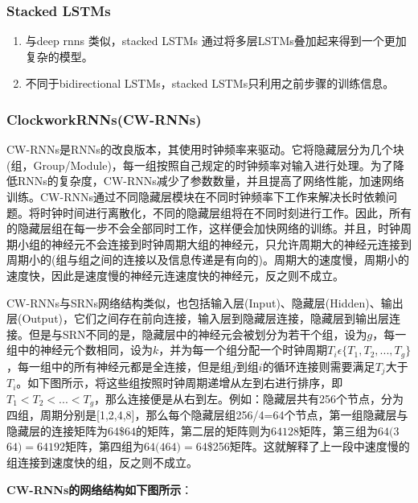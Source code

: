 \subsubsection{ Stacked LSTMs}\label{stacked-lstms}

\begin{enumerate}
\def\labelenumi{\arabic{enumi}.}
\item
  与deep rnns 类似，stacked LSTMs
  通过将多层LSTMs叠加起来得到一个更加复杂的模型。
\item
  不同于bidirectional LSTMs，stacked LSTMs只利用之前步骤的训练信息。
\end{enumerate}

\subsubsection{ ClockworkRNNs(CW-RNNs)}\label{clockwork-rnnscw-rnns}

​
CW-RNNs是RNNs的改良版本，其使用时钟频率来驱动。它将隐藏层分为几个块(组，Group/Module)，每一组按照自己规定的时钟频率对输入进行处理。为了降低RNNs的复杂度，CW-RNNs减少了参数数量，并且提高了网络性能，加速网络训练。CW-RNNs通过不同隐藏层模块在不同时钟频率下工作来解决长时依赖问题。将时钟时间进行离散化，不同的隐藏层组将在不同时刻进行工作。因此，所有的隐藏层组在每一步不会全部同时工作，这样便会加快网络的训练。并且，时钟周期小组的神经元不会连接到时钟周期大组的神经元，只允许周期大的神经元连接到周期小的(组与组之间的连接以及信息传递是有向的)。周期大的速度慢，周期小的速度快，因此是速度慢的神经元连速度快的神经元，反之则不成立。

​
CW-RNNs与SRNs网络结构类似，也包括输入层(Input)、隐藏层(Hidden)、输出层(Output)，它们之间存在前向连接，输入层到隐藏层连接，隐藏层到输出层连接。但是与SRN不同的是，隐藏层中的神经元会被划分为若干个组，设为\(g​\)，每一组中的神经元个数相同，设为\(k​\)，并为每一个组分配一个时钟周期\(T_i\epsilon\{T_1,T_2,...,T_g\}​\)，每一组中的所有神经元都是全连接，但是组\(j​\)到组\(i​\)的循环连接则需要满足\(T_j​\)大于\(T_i​\)。如下图所示，将这些组按照时钟周期递增从左到右进行排序，即\(T_1<T_2<...<T_g​\)，那么连接便是从右到左。例如：隐藏层共有256个节点，分为四组，周期分别是{[}1,2,4,8{]}，那么每个隐藏层组256/4=64个节点，第一组隐藏层与隐藏层的连接矩阵为64\$\times​\(64的矩阵，第二层的矩阵则为64\)\times​\(128矩阵，第三组为64\)\times​\((3\)\times​\(64)=64\)\times​\(192矩阵，第四组为64\)\times​\((4\)\times​\(64)=64\)\times​\$256矩阵。这就解释了上一段中速度慢的组连接到速度快的组，反之则不成立。

\textbf{CW-RNNs的网络结构如下图所示}：

